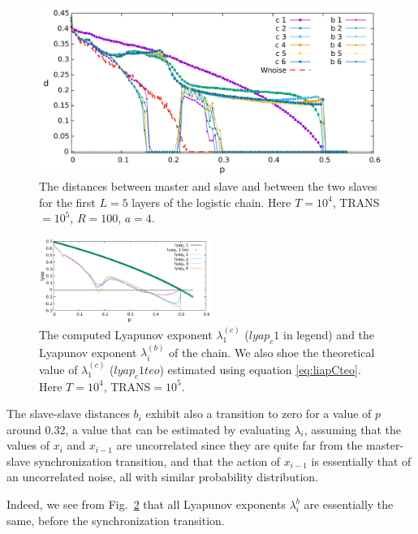 \documentclass[runningheads]{llncs}
\begin{document}
\begin{figure}
    \centering
    \includegraphics[width=0.35\textheight]{distancelogistic_b_c.pdf}
    \caption{The distances between master and slave and between the two slaves for the first $L=5$ layers of the logistic chain. Here $T=10^4$, TRANS$=10^5$, $R=100$, $a=4$. }
    \label{fig:distlogistic}
\end{figure}

\begin{figure}
    \centering
    \includegraphics[width=0.5\textwidth]{logisticL5_lyap.pdf}
    \caption{The computed Lyapunov exponent $\lambda_1^{(c)}$ (\textit{$lyap_c 1$} in legend) and the Lyapunov exponent $\lambda_i^{(b)}$ of the chain. We also shoe the theoretical value of $\lambda^{(c)}_1$ (\textit{$lyap_c 1 teo$}) estimated using equation \ref{eq:liapCteo}. Here $T=10^4$, TRANS$=10^5$.}
    \label{fig:lambda-logistic}
\end{figure}

The slave-slave distances $b_i$ exhibit also a transition to zero for a value of $p$ around $0.32$, a value that can be estimated by evaluating $\lambda_i$, assuming that the values of $x_i$ and $x_{i-1}$ are uncorrelated since they are quite far from the master-slave synchronization transition, and that the action of $x_{i-1}$ is essentially that of an uncorrelated noise, all with similar probability distribution.

Indeed, we see from Fig.~\ref{fig:lambda-logistic} that all Lyapunov exponents $\lambda_i^b$ are essentially the same, before the synchronization transition. 
\end{document}
